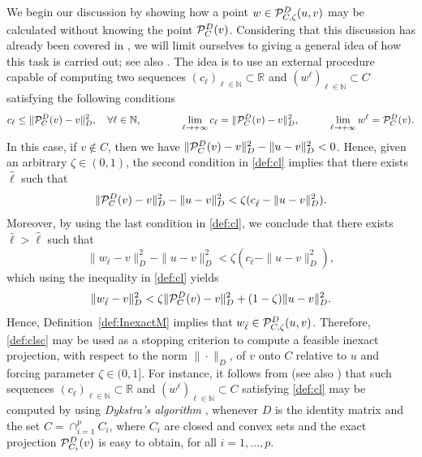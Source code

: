 We begin our discussion by showing how a point $w\in {\cal P}_{C, \zeta}^{D}(u,v)$ may be calculated  without knowing the point ${\cal P}_{C}^{D}(v)$.   Considering that this discussion has already been covered in \cite[Section~3,  Algorithm 3.1]{BirginMartinezRaydan2003},  we will limit ourselves to giving a general idea of how this task is carried out; see also \cite[Section~5.1]{Bonettini2016}.   The idea is to use an external procedure capable of computing two  sequences  $(c_\ell)_{\ell\in\mathbb{N}}\subset \mathbb{R}$  and   $(w^\ell)_{\ell\in\mathbb{N}}\subset C$ satisfying the following  conditions
\begin{equation}\label{def:cl}
	c_\ell \leq \|{\cal P}_{C}^{D}(v)-v\|_D^2,\quad  \forall\ell\in\mathbb{N}, \qquad \qquad \lim_{\ell \to +\infty} c_\ell = \|{\cal P}_{C}^{D}(v)-v\|_D^2, \qquad \quad   \lim_{\ell\to +\infty} w^\ell = {\cal P}_{C}^{D}(v).
\end{equation}
In this case,   if  $v\notin C$, then   we have $ \|{\cal P}_{C}^{D}(v)-v\|_D^2- \|u-v\|_D^2<0$. Hence,   given an arbitrary $ \zeta\in (0,1)$,  the second condition in \eqref{def:cl} implies  that   there exists $\hat{\ell}$ such that
$$
	\|{\cal P}_{C}^{D}(v)-v\|_D^2- \|u-v\|_D^2< \zeta (c_{\hat{\ell}}- \|u-v\|_D^2).
$$
Moreover, by using the last condition in \eqref{def:cl}, we conclude that   there exists $\bar{\ell}>\hat{\ell}$ such that
\begin{equation}\label{def:clsc}
	\|w_{\bar{\ell}}-v\|_D^2- \|u-v\|_D^2< \zeta (c_{\bar{\ell}}- \|u-v\|_D^2),
\end{equation}
which using   the inequality  in \eqref{def:cl} yields
$$
	\|w_{\bar{\ell}}-v\|_D^2<  \zeta \|{\cal P}_{C}^{D}(v)-v\|_D^2  +(1-\zeta) \|u-v\|_D^2.
$$
Hence, Definition~\ref{def:InexactM} implies that  $w_{\bar{\ell}}\in  {\cal P}_{C, \zeta}^{D}(u, v)$.   Therefore,   \eqref{def:clsc}  may be used as a stopping criterion to compute  a  feasible inexact projection,  with respect to the norm $\| \cdot \|_{D}$,  of $v$ onto $C$ relative to $u$ and forcing parameter $\zeta\in (0, 1]$. For instance,  it follows from   \cite[Theorem~3.2, Lemma~3.1]{BirginMartinezRaydan2003} (see also \cite{BirginRaydan2005}) that  such sequences  $(c_\ell)_{\ell\in\mathbb{N}}\subset \mathbb{R}$  and   $(w^\ell)_{\ell\in\mathbb{N}}\subset C$  satisfying  \eqref{def:cl}  may be computed by using   {\it Dykstra's algorithm} \cite{Dykstra1986, Dykstra1983}, whenever  $D$ is the identity matrix  and the set $C=\cap_{i=1}^p C_i$, where $C_i$ are closed and convex sets and the exact projection  ${\cal P}_{C_i}^{D}(v)$ is easy to obtain, for all $i=1,\dots,p$.

